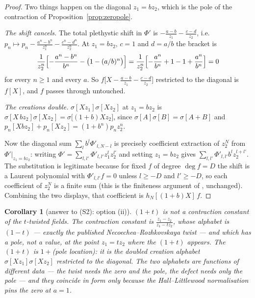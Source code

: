 \documentclass[11pt]{article}
\newtheorem{corollary}[theorem]{Corollary}
\theoremstyle{definition}
\begin{document}
\begin{proof}
Two things happen on the diagonal $z_1=bz_2$, which is the pole of the contraction of
Proposition~\ref{prop:zeropole}.

\emph{The shift cancels.}  The total plethystic shift in $\Phi'$ is
$-\frac{a-b}{z_1}-\frac{c-d}{z_2}$, i.e.\ $p_n\mapsto p_n-\frac{a^n-b^n}{z_1^{n}}
-\frac{c^n-d^n}{z_2^{n}}$.  At $z_1=bz_2$, $c=1$ and $d=a/b$ the bracket is
\[
  \frac{1}{z_2^{n}}\Bigl[-\frac{a^{n}-b^{n}}{b^{n}}-\bigl(1-(a/b)^{n}\bigr)\Bigr]
  =\frac{1}{z_2^{n}}\Bigl[-\frac{a^{n}}{b^{n}}+1-1+\frac{a^{n}}{b^{n}}\Bigr]=0
\]
for every $n\ge1$ and every $a$.  So $f\bigl[X-\frac{a-b}{z_1}-\frac{c-d}{z_2}\bigr]$
restricted to the diagonal is $f[X]$, and $f$ passes through untouched.

\emph{The creations double.}  $\sigma[Xz_1]\sigma[Xz_2]$ at $z_1=bz_2$ is
$\sigma[X\,bz_2]\sigma[Xz_2]=\sigma\bigl[(1+b)Xz_2\bigr]$, since
$\sigma[A]\sigma[B]=\sigma[A+B]$ and $p_n[Xbz_2]+p_n[Xz_2]=(1+b^{n})p_nz_2^{n}$.

Now the diagonal sum $\sum_l b^{l}\Phi'_{l,N-l}$ is precisely coefficient extraction of
$z_2^{N}$ from $\Phi'|_{z_1=bz_2}$: writing $\Phi'=\sum_{l,l'}\Phi'_{l,l'}z_1^{l}z_2^{l'}$
and setting $z_1=bz_2$ gives $\sum_{l,l'}\Phi'_{l,l'}b^{l}z_2^{l+l'}$.  The substitution is
legitimate because for fixed $f$ of degree $\deg f=D$ the shift is a Laurent polynomial with
$\Phi'_{l,l'}f=0$ unless $l\ge-D$ and $l'\ge-D$, so each coefficient of $z_2^{N}$ is a
finite sum (this is the finiteness argument of \cite[Lem.~3.3]{Q99}, unchanged).  Combining
the two displays, that coefficient is $h_N[(1+b)X]\,f$.
\end{proof}

\begin{corollary}[answer to (S2): option (ii)]\label{cor:S2}
$(1+t)$ is not a contraction constant of the $t$-twisted fields.  The contraction constant
is $\frac{z_1-z_2}{z_1-tz_2}$, whose alphabet is $(1-t)$ --- exactly the published
Necoechea--Rozhkovskaya twist --- and which has a \emph{pole}, not a value, at the point
$z_1=tz_2$ where the $(1+t)$ appears.  The $(1+t)$ is $1+{}$(pole location): it is the
doubled creation alphabet $\sigma[Xz_1]\sigma[Xz_2]$ restricted to the diagonal.  The two
alphabets are functions of different data --- the twist needs the zero \emph{and} the pole,
the defect needs only the pole --- and they coincide in form only because the
Hall--Littlewood normalisation pins the zero at $a=1$.
\end{corollary}
\end{document}

